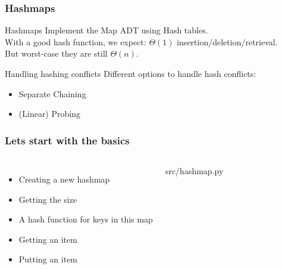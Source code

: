 \begin{frame}
	\frametitle{Hashmaps}
		\begin{block}{Hashmaps}
			Implement the Map ADT using Hash tables.\\
			\pause
			With a good hash function, we expect: $\Theta(1)$ insertion/deletion/retrieval.\\
			But worst-case they are still $\Theta(n)$.
		\end{block}	
		\pause
		\begin{block}{Handling hashing conflicts}
			Different options to handle hash conflicts:
			\begin{itemize}
				\item Separate Chaining
				\item (Linear) Probing
			\end{itemize}
		\end{block}
\end{frame}

\begin{frame}
	\frametitle{Lets start with the basics}
	\vspace{-13pt}
	\begin{columns}
		\begin{itemize}
			\item Creating a new hashmap
			\item<2-> Getting the size
			\item<3-> A hash function for keys in this map
			\item<4-> Getting an item
			\item<4-> Putting an item
		\end{itemize}
			
		
		{src/hashmap.py}
	\end{columns}
\end{frame}


